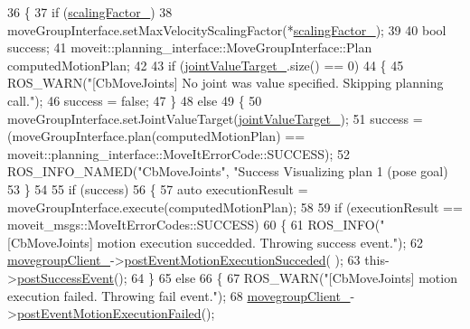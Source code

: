 \begin{DoxyCode}
36   \{
37     \textcolor{keywordflow}{if} (\hyperlink{classmove__group__interface__client_1_1CbMoveJoints_a05f9ed8765ddb6e02b108a790bdf8f88}{scalingFactor\_})
38       moveGroupInterface.setMaxVelocityScalingFactor(*\hyperlink{classmove__group__interface__client_1_1CbMoveJoints_a05f9ed8765ddb6e02b108a790bdf8f88}{scalingFactor\_});
39 
40     \textcolor{keywordtype}{bool} success;
41     moveit::planning\_interface::MoveGroupInterface::Plan computedMotionPlan;
42 
43     \textcolor{keywordflow}{if} (\hyperlink{classmove__group__interface__client_1_1CbMoveJoints_a7339a7f34ba2c481b6a0821db5f1a483}{jointValueTarget\_}.size() == 0)
44     \{
45       ROS\_WARN(\textcolor{stringliteral}{"[CbMoveJoints] No joint was value specified. Skipping planning call."});
46       success = \textcolor{keyword}{false};
47     \}
48     \textcolor{keywordflow}{else}
49     \{
50       moveGroupInterface.setJointValueTarget(\hyperlink{classmove__group__interface__client_1_1CbMoveJoints_a7339a7f34ba2c481b6a0821db5f1a483}{jointValueTarget\_});
51       success = (moveGroupInterface.plan(computedMotionPlan) == 
      moveit::planning\_interface::MoveItErrorCode::SUCCESS);
52       ROS\_INFO\_NAMED(\textcolor{stringliteral}{"CbMoveJoints"}, \textcolor{stringliteral}{"Success Visualizing plan 1 (pose goal) %
53     \}
54 
55     \textcolor{keywordflow}{if} (success)
56     \{
57       \textcolor{keyword}{auto} executionResult = moveGroupInterface.execute(computedMotionPlan);
58 
59       \textcolor{keywordflow}{if} (executionResult == moveit\_msgs::MoveItErrorCodes::SUCCESS)
60       \{
61         ROS\_INFO(\textcolor{stringliteral}{"[CbMoveJoints] motion execution succedded. Throwing success event."});
62         \hyperlink{classmove__group__interface__client_1_1CbMoveJoints_a9c1ffe89b25fc5693949241217d73e90}{movegroupClient\_}->\hyperlink{classmove__group__interface__client_1_1ClMoveGroup_a1b617e0018790b8ebf23aea75eb7acba}{postEventMotionExecutionSucceded}(
      );
63         this->\hyperlink{classsmacc_1_1SmaccAsyncClientBehavior_adf18efe1f0e4eacc1277b8865a8a94b1}{postSuccessEvent}();
64       \}
65       \textcolor{keywordflow}{else}
66       \{
67         ROS\_WARN(\textcolor{stringliteral}{"[CbMoveJoints] motion execution failed. Throwing fail event."});
68         \hyperlink{classmove__group__interface__client_1_1CbMoveJoints_a9c1ffe89b25fc5693949241217d73e90}{movegroupClient\_}->\hyperlink{classmove__group__interface__client_1_1ClMoveGroup_a41c0eebdb446e6fbdd17113524c34869}{postEventMotionExecutionFailed}();
}
\end{DoxyCode}
